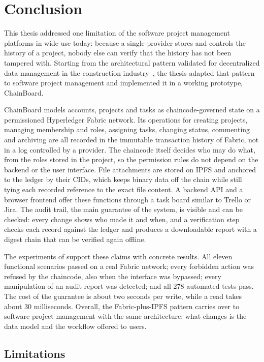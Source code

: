 \chapter{Conclusion}
\label{ch:conclusion}

This thesis addressed one limitation of the software project management platforms in wide use today: because a single provider stores and controls the history of a project, nobody else can verify that the history has not been tampered with. Starting from the architectural pattern validated for decentralized data management in the construction industry~\cite{adel2023}, the thesis adapted that pattern to software project management and implemented it in a working prototype, ChainBoard.

ChainBoard models accounts, projects and tasks as chaincode-governed state on a permissioned Hyperledger Fabric network. Its operations for creating projects, managing membership and roles, assigning tasks, changing status, commenting and archiving are all recorded in the immutable transaction history of Fabric, not in a log controlled by a provider. The chaincode itself decides who may do what, from the roles stored in the project, so the permission rules do not depend on the backend or the user interface. File attachments are stored on IPFS and anchored to the ledger by their CIDs, which keeps binary data off the chain while still tying each recorded reference to the exact file content. A backend API and a browser frontend offer these functions through a task board similar to Trello or Jira. The audit trail, the main guarantee of the system, is visible and can be checked: every change shows who made it and when, and a verification step checks each record against the ledger and produces a downloadable report with a digest chain that can be verified again offline.

The experiments of  support these claims with concrete results. All eleven functional scenarios passed on a real Fabric network; every forbidden action was refused by the chaincode, also when the interface was bypassed; every manipulation of an audit report was detected; and all 278 automated tests pass. The cost of the guarantee is about two seconds per write, while a read takes about 30 milliseconds. Overall, the Fabric-plus-IPFS pattern carries over to software project management with the same architecture; what changes is the data model and the workflow offered to users.

\section{Limitations}
\label{sec:limitations}

